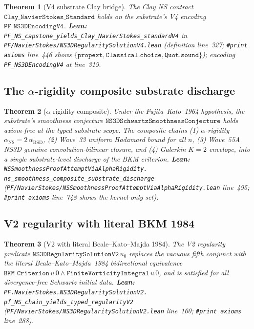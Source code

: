 \documentclass[11pt,a4paper]{article}
\theoremstyle{plain}
\newtheorem{theorem}{Theorem}[section]
\theoremstyle{definition}
\begin{document}
\begin{theorem}[V4 substrate Clay bridge]
\label{thm:v4}
The Clay NS contract
$\mathtt{Clay\_NavierStokes\_Standard}$ holds on the substrate's V4
encoding $\mathtt{PF\_NS3DEncodingV4}$.
\textbf{Lean:}
\texttt{PF\_NS\_capstone\_yields\_Clay\_NavierStokes\_standardV4} in
\texttt{PF/NavierStokes/NS3DRegularitySolutionV4.lean}
(definition line~327; \verb|#print axioms| line~446 shows
$\{\texttt{propext}, \texttt{Classical.choice}, \texttt{Quot.sound}\}$);
encoding
\texttt{PF\_NS3DEncodingV4} at line~319.
\end{theorem}

\subsection{The $\alpha$-rigidity composite substrate discharge}

\begin{theorem}[$\alpha$-rigidity composite]
\label{thm:alpharig}
Under the Fujita--Kato~1964 hypothesis, the substrate's smoothness
conjecture
$\mathtt{NS3DSchwartzSmoothnessConjecture}$ holds axiom-free at the
typed substrate scope. The composite chains
\textnormal{(1)} $\alpha$-rigidity
$\alpha_{\mathrm{NS}} = 2\,\alpha_{\mathrm{BSD}}$,
\textnormal{(2)} Wave~33 uniform Hadamard bound for all $n$,
\textnormal{(3)} Wave~55A NS3D genuine convolution-bilinear closure,
and
\textnormal{(4)} Galerkin $K = 2$ envelope,
into a single substrate-level discharge of the BKM criterion.
\textbf{Lean:}
\texttt{NSSmoothnessProofAttemptViaAlphaRigidity.\\
ns\_smoothness\_composite\_substrate\_discharge}
(\texttt{PF/NavierStokes/NSSmoothnessProofAttemptViaAlphaRigidity.lean}
line~495; \verb|#print axioms| line~748 shows the kernel-only set).
\end{theorem}

\subsection{V2 regularity with literal BKM 1984}

\begin{theorem}[V2 with literal Beale--Kato--Majda 1984]
\label{thm:v2}
The V2 regularity predicate
$\mathtt{NS3DRegularitySolutionV2}\,u_{0}$ replaces the vacuous
fifth conjunct with the literal Beale--Kato--Majda~1984
bidirectional equivalence
$\mathtt{BKM\_Criterion}\,u\,0
\wedge \mathtt{FiniteVorticityIntegral}\,u\,0$, and is satisfied for
all divergence-free Schwartz initial data.
\textbf{Lean:}
\texttt{PF.NavierStokes.NS3DRegularitySolutionV2.\\
pf\_NS\_chain\_yields\_typed\_regularityV2}
(\texttt{PF/NavierStokes/NS3DRegularitySolutionV2.lean} line~160;
\verb|#print axioms| line~288).
\end{theorem}
\end{document}
